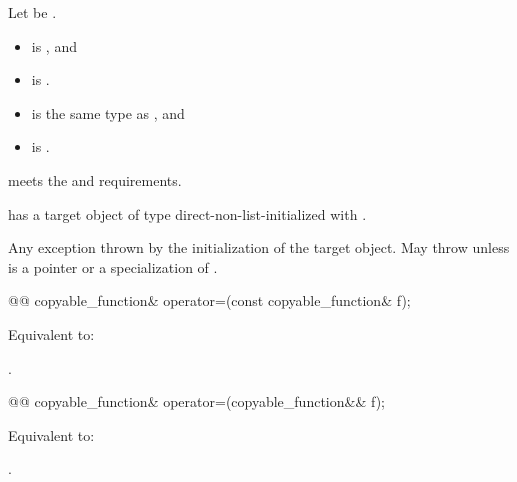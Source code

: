 \begin{itemdescr}
\pnum
Let  be .

\pnum
\constraints
\begin{itemize}
\item {} is , and
\item {} is .
\end{itemize}

\pnum
\mandates
\begin{itemize}
\item {} is the same type as , and
\item {} is .
\end{itemize}

\pnum
\expects
{} meets the  and  requirements.

\pnum
\ensures
{} has a target object of type  direct-non-list-initialized with .

\pnum
\throws
Any exception thrown by the initialization of the target object. May throw  unless  is a pointer or a specialization of .
\end{itemdescr}

%
\begin{itemdecl}
@@ copyable_function& operator=(const copyable_function& f);
\end{itemdecl}

\begin{itemdescr}
\pnum
\effects
Equivalent to: 

\pnum
\returns
{}.
\end{itemdescr}

%
\begin{itemdecl}
@@ copyable_function& operator=(copyable_function&& f);
\end{itemdecl}

\begin{itemdescr}
\pnum
\effects
Equivalent to: 

\pnum
\returns
{}.
\end{itemdescr}

